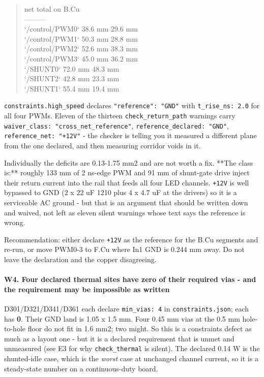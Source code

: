 \documentclass[11pt,a4paper]{article}
\begin{document}
\begin{quote}\small\ttfamily\raggedright
\textbar{} net \textbar{} total \textbar{} on B.Cu \textbar{}\\
\textbar{}---\textbar{}---\textbar{}---\textbar{}\\
\textbar{} `/control/PWM0` \textbar{} 38.6 mm \textbar{} 29.6 mm \textbar{}\\
\textbar{} `/control/PWM1` \textbar{} 50.3 mm \textbar{} 28.8 mm \textbar{}\\
\textbar{} `/control/PWM2` \textbar{} 52.6 mm \textbar{} 38.3 mm \textbar{}\\
\textbar{} `/control/PWM3` \textbar{} 45.0 mm \textbar{} 36.2 mm \textbar{}\\
\textbar{} `/SHUNT0` \textbar{} 72.0 mm \textbar{} 48.3 mm \textbar{}\\
\textbar{} `/SHUNT2` \textbar{} 42.8 mm \textbar{} 23.3 mm \textbar{}\\
\textbar{} `/SHUNT1` \textbar{} 55.4 mm \textbar{} 19.4 mm \textbar{}
\end{quote}
\texttt{constraints.high\_speed} declares \texttt{"reference": "GND"} with \texttt{t\_rise\_ns: 2.0} for all four PWMs. Eleven of the thirteen \texttt{check\_return\_path} warnings carry \texttt{waiver\_class: "cross\_net\_reference"}, \texttt{reference\_declared: "GND"}, \texttt{reference\_net: "+12V"} - the checker is telling you it measured a different plane from the one declared, and then measuring corridor voids in it.

Individually the deficits are 0.13-1.75 mm2 and are not worth a fix. {*}{*}The class is:{*}{*} roughly 133 mm of 2 ns-edge PWM and 91 mm of shunt-gate drive inject their return current into the rail that feeds all four LED channels. \texttt{+12V} is well bypassed to GND (2 x 22 uF 1210 plus 4 x 4.7 uF at the drivers) so it is a serviceable AC ground - but that is an argument that should be written down and waived, not left as eleven silent warnings whose text says the reference is wrong.

Recommendation: either declare \texttt{+12V} as the reference for the B.Cu segments and re-run, or move PWM0-3 to F.Cu where In1 GND is 0.244 mm away. Do not leave the declaration and the copper disagreeing.

\paragraph*{W4. Four declared thermal sites have zero of their required vias - and the requirement may be impossible as written}
D301/D321/D341/D361 each declare \texttt{min\_vias: 4} in \texttt{constraints.json}; each has \textbf{0}. Their GND land is 1.05 x 1.5 mm. Four 0.45 mm vias at the 0.5 mm hole-to-hole floor do not fit in 1.6 mm2; two might. So this is a constraints defect as much as a layout one - but it is a declared requirement that is unmet and unmeasured (see E3 for why \texttt{check\_thermal} is silent). The declared 0.14 W is the shunted-idle case, which is the \emph{worst} case at unchanged channel current, so it is a steady-state number on a continuous-duty board.
\end{document}
